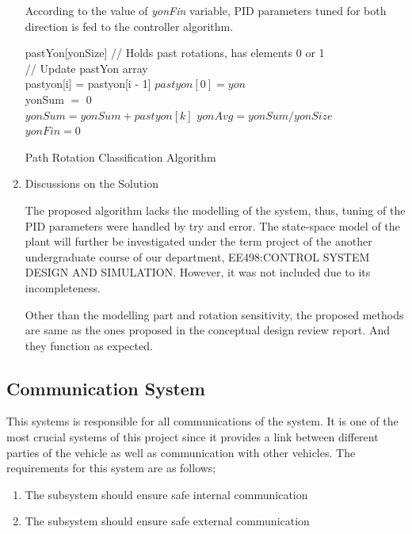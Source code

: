 \documentclass[a4paper,12pt]{article}
\begin{document}
\begin{enumerate}
	According to the value of \textit{yonFin} variable, PID parameters tuned for both direction is fed to the controller algorithm.
	
	\begin{algorithm}
		\DontPrintSemicolon	
		pastYon[yonSize] // Holds past rotations, has elements 0 or 1 \\
		// Update pastYon array \\ 
		 {
			pastyon[i] = pastyon[i - 1]
		}
		$ pastyon[0]=yon $\\
		yonSum $=$ 0 \\
		{
			$ yonSum = yonSum + pastyon[k] $
		}
		$ yonAvg=yonSum/yonSize $\\ 
		 {
			$yonFin=0$ 
		}   
		\caption{Path Rotation Classification Algorithm}
		\label{algo:ratation}
	\end{algorithm}
	
	\item {Discussions on the Solution}
	
	The proposed algorithm lacks the modelling of the system, thus, tuning of the PID parameters were handled by try and error. The state-space model of the plant will further be investigated under the term project of the another undergraduate course of our department, EE498:CONTROL SYSTEM DESIGN AND SIMULATION. However, it was not included due to its incompleteness.	
	
	Other than the modelling part and rotation sensitivity, the proposed methods are same as the ones proposed in the conceptual design review report. And they function as expected. 


\end{enumerate}


\subsection{Communication System}

	This systems is responsible for all communications of the system. It is one of the most crucial systems of this project since it provides a link between different parties of the vehicle as well as communication with other vehicles. The requirements for this system are as follows;		

	\begin{enumerate}
		\item The subsystem should ensure safe internal communication
		\item The subsystem should ensure safe external communication
	\end{enumerate}	
\end{document}
